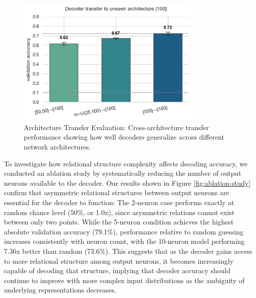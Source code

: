 \documentclass[11pt]{article}
\begin{document}
\begin{figure}[htbp]
\centering
\includegraphics[width=0.8\textwidth]{figures/architecture-transfer-evaluation.png}
\caption{Architecture Transfer Evaluation: Cross-architecture transfer performance showing how well decoders generalize across different network architectures.}
\label{fig:architecture-transfer}
\end{figure}

To investigate how relational structure complexity affects decoding accuracy, we conducted an ablation study by systematically reducing the number of output neurons available to the decoder. Our results shown in Figure \ref{fig:ablation-study} confirm that asymmetric relational structures between output neurons are essential for the decoder to function: The 2-neuron case performs exactly at random chance level (50\%, or 1.0x), since asymmetric relations cannot exist between only two points. While the 5-neuron condition achieves the highest absolute validation accuracy (79.1\%), performance relative to random guessing increases consistently with neuron count, with the 10-neuron model performing 7.36x better than random (73.6\%). This suggests that as the decoder gains access to more relational structure among output neurons, it becomes increasingly capable of decoding that structure, implying that decoder accuracy should continue to improve with more complex input distributions as the ambiguity of underlying representations decreases.
\end{document}
